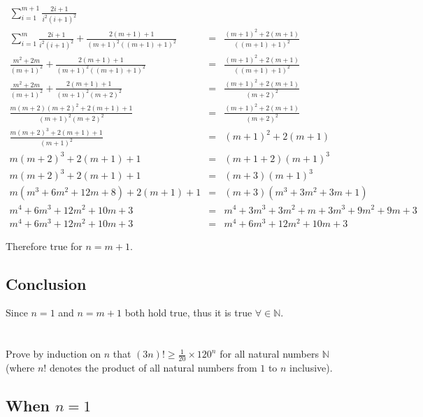 \documentclass[a4paper,12pt]{article}
\begin{document}
\begin{eqnarray*}
\sum^{m + 1}_{i = 1} \frac{2i + 1}{i^{2}(i + 1)^{2}} \\
\sum^{m}_{i = 1} \frac{2i + 1}{i^{2}(i + 1)^{2}} + 
\frac{2(m + 1) + 1}{(m + 1)^{2}((m + 1) + 1)^{2}} 
& = & \frac{(m + 1)^{2} + 2(m + 1)}{((m+ 1) + 1)^{2}} \\
\frac{m^{2} + 2m}{(m + 1)^{2}} + 
\frac{2(m + 1) + 1}{(m + 1)^{2}((m + 1) + 1)^{2}}
& = & \frac{(m + 1)^{2} + 2(m + 1)}{((m+ 1) + 1)^{2}} \\
\frac{m^{2} + 2m}{(m + 1)^{2}} +
\frac{2(m + 1) + 1}{(m + 1)^{2}(m + 2)^{2}}
& = & \frac{(m + 1)^{2} + 2(m + 1)}{(m + 2)^{2}} \\
\frac{m(m + 2)(m + 2)^{2} + 2(m + 1) + 1}{(m + 1)^{2}(m + 2)^{2}}
& = & \frac{(m + 1)^{2} + 2(m + 1)}{(m + 2)^{2}} \\
\frac{m(m + 2)^{3} + 2(m + 1) + 1}{(m + 1)^{2}}
& = & (m + 1)^{2} + 2(m + 1) \\
m(m + 2)^{3} + 2(m + 1) + 1
& = & (m + 1 + 2)(m + 1)^{3} \\
m(m + 2)^{3} + 2(m + 1) + 1
& = & (m + 3)(m + 1)^{3} \\
m(m^{3} + 6m^{2} + 12m + 8) + 2(m + 1) + 1
& = & (m + 3)(m^{3} + 3m^{2} + 3m + 1) \\
m^{4} + 6m^{3} + 12m^{2} + 10m + 3
& = & m^{4} + 3m^{3} + 3m^{2} + m + 3m^{3} + 9m^{2} + 9m + 3 \\
m^{4} + 6m^{3} + 12m^{2} + 10m + 3
& = & m^{4} + 6m^{3} + 12m^{2} + 10m + 3
\end{eqnarray*}

\noindent Therefore true for $n = m + 1$.

\subsection{Conclusion}

Since $n = 1$ and $n = m + 1$ both hold true, thus it is true $\forall
\in \mathbb{N}$.

\pagebreak

\section{}

Prove by induction on $n$ that $(3n)! \geq \frac{1}{20} \times 120^{n}$
for all natural numbers $\mathbb{N}$ (where $n!$ denotes the product of
all natural numbers from $1$ to $n$ inclusive).

\subsection{When $n = 1$}
\end{document}
